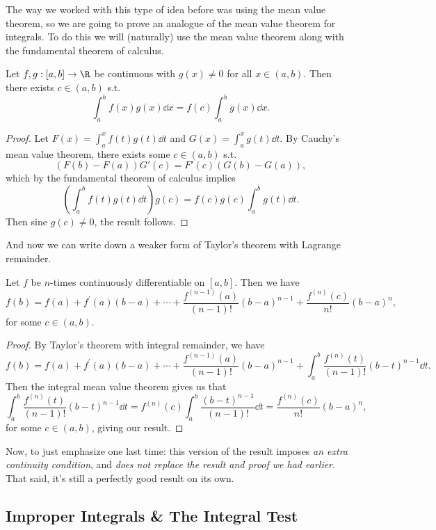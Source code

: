 The way we worked with this type of idea before was using the mean value theorem, so we are going to prove an analogue of the mean value theorem for integrals. To do this we will (naturally) use the mean value theorem along with the fundamental theorem of calculus.


\begin{lemma}
	Let $f, g : [a, b] \rightarrow \R$ be continuous with $g(x) \neq 0$ for all $x \in (a, b)$. Then there exists $c \in (a, b)$ s.t.
	$$
	\int_a^b f(x) g(x) \dd x = f(c) \int_a^b g(x) \dd x.
	$$
\end{lemma}
\begin{proof}
	Let $F(x) = \int_a^x f(t) g(t) \dd t$ and $G(x) = \int_a^x g(t) \dd t$.
	By Cauchy's mean value theorem, there exists some $c \in (a, b)$ s.t.
	$$
	(F(b) - F(a))G'(c) = F'(c)(G(b) - G(a)),
	$$
	which by the fundamental theorem of calculus implies
	$$
	\left(\int_a^b f(t) g(t) \dd t\right)g(c) = f(c) g(c) \int_a^b g(t) \dd t.
	$$
	Then sine $g(c) \neq 0$, the result follows.
\end{proof}


And now we can write down a weaker form of Taylor's theorem with Lagrange remainder.

\begin{theorem}
	Let $f$ be $n$-times continuously differentiable on $[a, b]$. Then we have
	$$
	f(b)=f(a)+f^{\prime}(a)(b-a)+\cdots+\frac{f^{(n-1)}(a)}{(n-1) !}(b-a)^{n-1}+\frac{f^{(n)}(c)}{n !}(b-a)^{n},
	$$
	for some $c \in (a, b)$.
\end{theorem}
\begin{proof}
	By Taylor's theorem with integral remainder, we have
	$$
	f(b)=f(a)+f^{\prime}(a)(b-a)+\cdots+\frac{f^{(n-1)}(a)}{(n-1) !}(b-a)^{n-1}+\int_{a}^{b} \frac{f^{(n)}(t)}{(n-1) !}(b-t)^{n-1} \dd t.
	$$
	Then the integral mean value theorem gives us that
	$$
	\int_{a}^{b} \frac{f^{(n)}(t)}{(n-1) !}(b-t)^{n-1} \dd t = f^{(n)}(c) \int_{a}^{b} \frac{(b-t)^{n-1}}{(n-1) !} \dd t = \frac{f^{(n)}(c)}{n!}(b - a)^n, 
	$$
	for some $c \in (a, b)$, giving our result.
\end{proof}

Now, to just emphasize one last time: this version of the result imposes \emph{an extra continuity condition}, and \emph{does not replace the result and proof we had earlier}. That said, it's still a perfectly good result on its own.

\subsection{Improper Integrals \& The Integral Test}

